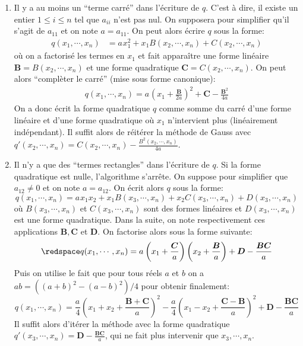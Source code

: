 \begin{enumerate}
	\item Il y a au moins un ``terme carré'' dans l'écriture de $q$. C'est à dire, il existe un entier $1\leq i\leq n$ tel que $a_{ii}$ n'est pas nul. On supposera pour simplifier qu'il s'agit de $a_{11}$ et on note $a=a_{11}$. On peut alors écrire $q$ sous la forme:
		\begin{align*}
			q(x_1,\cdots,x_n) & = a_{} x_1^2 + x_1 B(x_2,\cdots,x_n) + C(x_2,\cdots,x_n)
		\end{align*}
où on a factorisé les termes en $x_1$ et fait apparaître une forme linéaire $\boldsymbol B = B(x_2,\cdots,x_n)$ et une forme quadratique $\boldsymbol C = C(x_2,\cdots,x_n)$. On peut alors ``complèter le carré'' (mise sous forme canonique):
		\begin{align*}
		q(x_1,\cdots,x_n) = a_{} \left( x_1 + \frac{\boldsymbol B}{2a} \right)^2 +  \boldsymbol C - \frac{\boldsymbol B^2}{4a}
		\end{align*}
		On a donc écrit la forme quadratique $q$ comme somme du carré d'une forme linéaire et d'une forme quadratique où $x_1$ n'intervient plus (linéairement indépendant). Il suffit alors de réitérer la méthode de Gauss avec $q'(x_2,\cdots,x_n) = C(x_2,\cdots,x_n)-\frac{B^2(x_2,\cdots,x_n)}{4a}$. 

		\medskip

\sld{\vfill\pagebreak[5]}%
	\item Il n'y a que des ``termes rectangles'' dans l'écriture de $q$. Si la forme quadratique est nulle, l'algorithme s'arrête. On suppose pour simplifier que $a_{12} \neq 0$ et on note $a=a_{12}$. On écrit alors $q$ sous la forme:
		\[
			q(x_1,\cdots,x_n) = a_{} x_1 x_2 + x_1 B(x_3,\cdots,x_n) + x_2  C(x_3,\cdots,x_n) + D(x_3,\cdots,x_n)
		\]
		où $B(x_3,\cdots,x_n)$ et $ C(x_3,\cdots,x_n)$ sont des formes linéaires et $D(x_3,\cdots,x_n)$ est une forme quadratique. Dans la suite, on note respectivement ces applications $\boldsymbol B,\boldsymbol C $ et $\boldsymbol D.$ On factorise alors sous la forme suivante: 
		\[\redspace
			q(x_1,\cdots,x_n)  = a_{}\left( x_1 + \frac{\boldsymbol C}{a} \right)\left( x_2 + \frac{\boldsymbol B}{a} \right) + \boldsymbol D - \frac{\boldsymbol B\boldsymbol C}{a}
		\]
		Puis on utilise le fait que pour tous réels $a$ et $b$ on a $ab= ((a+b)^2-(a-b)^2)/4$ pour obtenir finalement:
		\[%
			q(x_1,\cdots,x_n)  = \frac{a_{}}{4} \left( x_1 + x_2 + \frac{\boldsymbol B+ \boldsymbol C}{a} \right)^2 -\frac{a_{}}{4}  \left( x_1 - x_2 + \frac{\boldsymbol C-\boldsymbol B}{a} \right)^2 + \boldsymbol D - \frac{\boldsymbol B\boldsymbol C}{a}
		\]
		Il suffit alors d'itérer la méthode avec la forme quadratique $q'(x_3,\cdots,x_n) =  \boldsymbol D - \frac{\boldsymbol B \boldsymbol C}{a}$, qui ne fait plus intervenir que $x_3,\cdots,x_n$. 
\end{enumerate}

